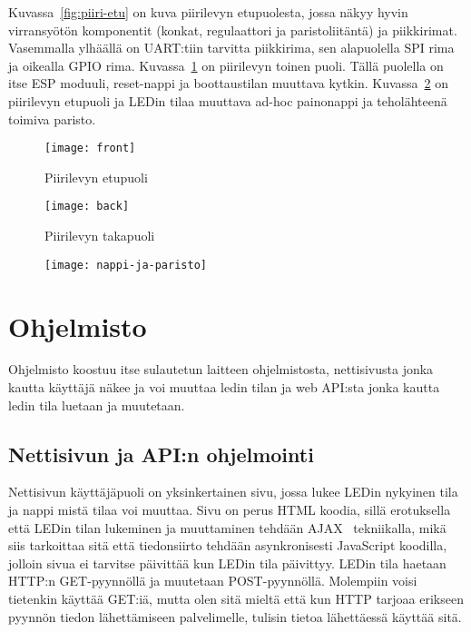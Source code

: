 Kuvassa~\ref{fig:piiri-etu} on kuva piirilevyn etupuolesta, jossa näkyy hyvin
virransyötön komponentit (konkat, regulaattori ja paristoliitäntä) ja
piikkirimat. Vasemmalla ylhäällä on UART:tiin tarvitta piikkirima, sen
alapuolella SPI rima ja oikealla GPIO rima. Kuvassa~\ref{fig:piiri-taka} on
piirilevyn toinen puoli. Tällä puolella on itse ESP moduuli, reset-nappi ja
boottaustilan muuttava kytkin. Kuvassa~\ref{fig:nappi-ja-paristo} on piirilevyn
etupuoli ja LEDin tilaa muuttava ad-hoc painonappi ja teholähteenä toimiva
paristo.
\begin{figure}[H]
\centering
\begin{minipage}{.5\textwidth}
  \centering
  \texttt{[image: front]}
  \caption{Piirilevyn etupuoli}
\label{fig:piiri-etu}
\end{minipage}%
\begin{minipage}{.5\textwidth}
  \centering
  \texttt{[image: back]}
  \caption{Piirilevyn takapuoli}
\label{fig:piiri-taka}
\end{minipage}
\end{figure}
\begin{figure}[H]
  \centering
  \texttt{[image: nappi-ja-paristo]}
  \caption{}
\label{fig:nappi-ja-paristo}
\end{figure}

\section{Ohjelmisto}
Ohjelmisto koostuu itse sulautetun laitteen ohjelmistosta, nettisivusta jonka
kautta käyttäjä näkee ja voi muuttaa ledin tilan ja web API:sta jonka kautta
ledin tila luetaan ja muutetaan.

\subsection{Nettisivun ja API:n ohjelmointi}
Nettisivun käyttäjäpuoli on yksinkertainen sivu, jossa lukee LEDin nykyinen
tila ja nappi mistä tilaa voi muuttaa. Sivu on perus HTML koodia, sillä
erotuksella että LEDin tilan lukeminen ja muuttaminen tehdään AJAX~\cite{ajax}
tekniikalla, mikä siis tarkoittaa sitä että tiedonsiirto tehdään asynkronisesti
JavaScript koodilla, jolloin sivua ei tarvitse päivittää kun LEDin tila
päivittyy. LEDin tila haetaan HTTP:n GET-pyynnöllä ja muutetaan POST-pyynnöllä.
Molempiin voisi tietenkin käyttää GET:iä, mutta olen sitä mieltä että kun HTTP
tarjoaa erikseen pyynnön tiedon lähettämiseen palvelimelle, tulisin tietoa
lähettäessä käyttää sitä.

